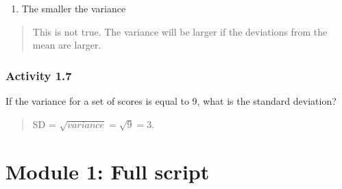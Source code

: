 \documentclass[
]{memoir}
\providecommand{\tightlist}{%
  \setlength{\itemsep}{0pt}\setlength{\parskip}{0pt}}
\begin{document}
\begin{enumerate}
\def\labelenumi{\alph{enumi})}
\setcounter{enumi}{2}
\tightlist
\item
  The smaller the variance
\end{enumerate}

\begin{quote}
This is not true. The variance will be larger if the deviations from the mean are larger.
\end{quote}

\hypertarget{activity-1.7}{%
\subsection*{Activity 1.7}\label{activity-1.7}}

If the variance for a set of scores is equal to 9, what is the standard deviation?

\begin{quote}
SD = \(\sqrt{variance} = \sqrt{9} = 3\).
\end{quote}

\hypertarget{module-1-full-script}{%
\chapter*{Module 1: Full script}\label{module-1-full-script}}
\end{document}
